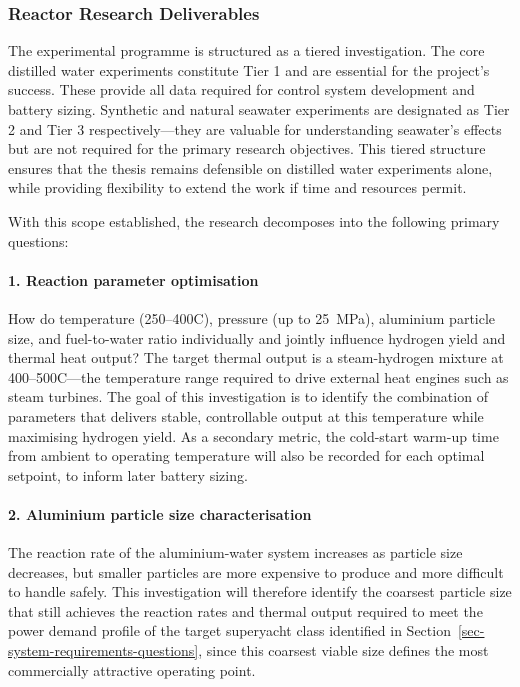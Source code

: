 \documentclass[12pt]{article}
\begin{document}
\subsubsection*{Reactor Research Deliverables}

The experimental programme is structured as a tiered investigation. The core 
distilled water experiments constitute Tier 1 and are essential for the project's 
success. These provide all data required for control system development and 
battery sizing. Synthetic and natural seawater experiments are designated as 
Tier 2 and Tier 3 respectively---they are valuable for understanding seawater's 
effects but are not required for the primary research objectives. This tiered 
structure ensures that the thesis remains defensible on distilled water 
experiments alone, while providing flexibility to extend the work if time and 
resources permit.

With this scope established, the research decomposes into the following primary 
questions:

\paragraph{1. Reaction parameter optimisation}

How do temperature (250--400\textdegree C), pressure (up to 25~MPa), aluminium 
particle size, and fuel-to-water ratio individually and jointly influence hydrogen 
yield and thermal heat output? The target thermal output is a steam-hydrogen mixture 
at 400--500\textdegree C---the temperature range required to drive external heat 
engines such as steam turbines. The goal of this investigation is to identify the 
combination of parameters that delivers stable, controllable output at this 
temperature while maximising hydrogen yield. As a secondary metric, the cold-start 
warm-up time from ambient to operating temperature will also be recorded for each 
optimal setpoint, to inform later battery sizing.

\paragraph{2. Aluminium particle size characterisation}

The reaction rate of the aluminium-water system increases as particle size decreases, 
but smaller particles are more expensive to produce and more difficult to handle 
safely. This investigation will therefore identify the coarsest particle size that 
still achieves the reaction rates and thermal output required to meet the power 
demand profile of the target superyacht class identified in Section~\ref{sec-system-requirements-questions}, 
since this coarsest viable size defines the most commercially attractive operating 
point.
\end{document}
